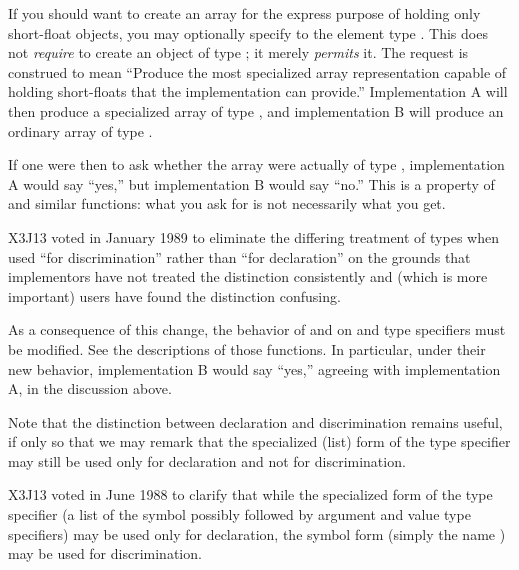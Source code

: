 If you should want to create an array for the
express purpose of holding only short-float objects, you may
optionally specify to  the element type
.  This does not \emph{require}  to create
an object of type ; it merely \emph{permits} it.  The
request is construed to mean ``Produce the most specialized array
representation capable of holding short-floats that the implementation
can provide.''  Implementation A will then produce a specialized
array of type , and implementation B
will produce an ordinary array of type .

If one were then to ask whether the array were actually of type
, implementation A would say ``yes,'' but
implementation B would say ``no.''  This is a property of 
and similar functions: what you ask for is not necessarily what you get. 

\begin{new}
X3J13 voted in January 1989
to eliminate the differing treatment of types
when used ``for discrimination'' rather than ``for declaration'' on the grounds
that implementors have not treated the distinction consistently
and (which is more important) users have found the distinction confusing.

As a consequence of this change, the behavior of  and 
on  and  type specifiers must be modified.
See the descriptions of those functions.  In particular, under their new
behavior, implementation B would say ``yes,'' agreeing with implementation A,
in the discussion above.

Note that the distinction between declaration and discrimination remains
useful, if only so that we may remark that the specialized (list)
form of the
 type specifier may still be used only for declaration and
not for discrimination.
\end{new}

\begin{new}
X3J13 voted in June 1988  to clarify that
while the specialized form of the  type specifier
(a list of the symbol  possibly followed by
argument and value type specifiers)
may be used only for declaration, the symbol form (simply the name
) may be used for discrimination.
\end{new}


